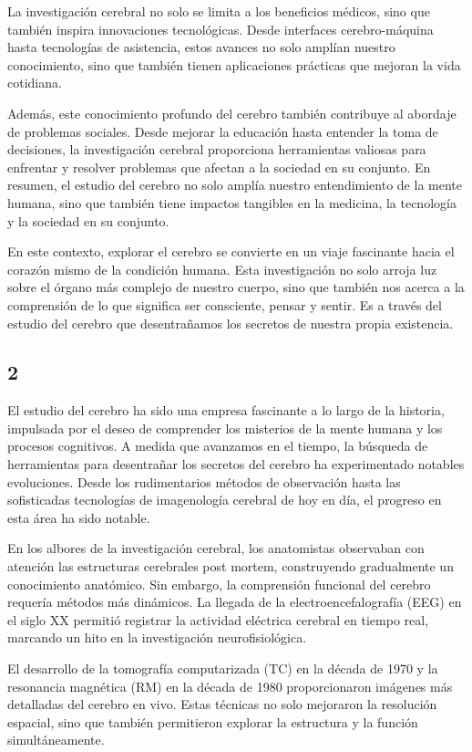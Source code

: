 \documentclass[12pt,oneside]{uhthesis}
\begin{document}
La investigación cerebral no solo se limita a los beneficios médicos, sino que también inspira innovaciones tecnológicas. Desde interfaces cerebro-máquina hasta tecnologías de asistencia, estos avances no solo amplían nuestro conocimiento, sino que también tienen aplicaciones prácticas que mejoran la vida cotidiana.

Además, este conocimiento profundo del cerebro también contribuye al abordaje de problemas sociales. Desde mejorar la educación hasta entender la toma de decisiones, la investigación cerebral proporciona herramientas valiosas para enfrentar y resolver problemas que afectan a la sociedad en su conjunto. En resumen, el estudio del cerebro no solo amplía nuestro entendimiento de la mente humana, sino que también tiene impactos tangibles en la medicina, la tecnología y la sociedad en su conjunto.

En este contexto, explorar el cerebro se convierte en un viaje fascinante hacia el corazón mismo de la condición humana. Esta investigación no solo arroja luz sobre el órgano más complejo de nuestro cuerpo, sino que también nos acerca a la comprensión de lo que significa ser consciente, pensar y sentir. Es a través del estudio del cerebro que desentrañamos los secretos de nuestra propia existencia.

\subsection{2}

El estudio del cerebro ha sido una empresa fascinante a lo largo de la historia, impulsada por el deseo de comprender los misterios de la mente humana y los procesos cognitivos. A medida que avanzamos en el tiempo, la búsqueda de herramientas para desentrañar los secretos del cerebro ha experimentado notables evoluciones. Desde los rudimentarios métodos de observación hasta las sofisticadas tecnologías de imagenología cerebral de hoy en día, el progreso en esta área ha sido notable.

En los albores de la investigación cerebral, los anatomistas observaban con atención las estructuras cerebrales post mortem, construyendo gradualmente un conocimiento anatómico. Sin embargo, la comprensión funcional del cerebro requería métodos más dinámicos. La llegada de la electroencefalografía (EEG) en el siglo XX permitió registrar la actividad eléctrica cerebral en tiempo real, marcando un hito en la investigación neurofisiológica.

El desarrollo de la tomografía computarizada (TC) en la década de 1970 y la resonancia magnética (RM) en la década de 1980 proporcionaron imágenes más detalladas del cerebro en vivo. Estas técnicas no solo mejoraron la resolución espacial, sino que también permitieron explorar la estructura y la función simultáneamente.
\end{document}
